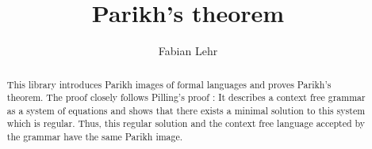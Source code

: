 \documentclass[11pt,a4paper]{article}
\begin{document}
\title{Parikh's theorem}
\author{Fabian Lehr}
\maketitle

\begin{abstract}
  This library introduces Parikh images of formal languages and
  proves Parikh's theorem. The proof closely follows Pilling's proof \cite{Pilling}:
  It describes a context free grammar as a system of equations and
  shows that there exists a minimal solution to this system which is
  regular. Thus, this regular solution and the context free language
  accepted by the grammar have the same Parikh image.
\end{abstract}

\tableofcontents





\end{document}
